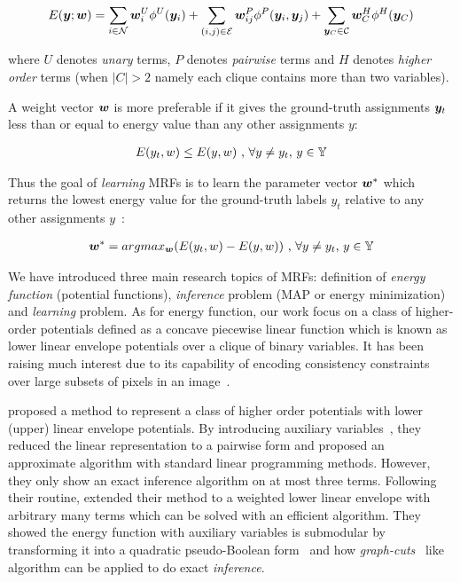 \begin{align}
  \label{eq:energyfunction_UPH}
  E({\bm{y}};{\bm{w}})=\sum_{i\in {\mathcal{N}}}{{\bm{w}}_i^U\phi^U({\bm{y}}_i)}+
  \sum_{(i,j)\in {\mathcal{E}}}{{\bm{w}}_{ij}^P\phi^P({\bm{y}}_i,{\bm{y}}_j)}+
  \sum_{{\bm{y}}_C\in {\mathcal{C}}}{{\bm{w}}_C^H\phi^H({\bm{y}}_C)}
\end{align}

\noindent where $U$ denotes \emph{unary} terms, $P$ denotes
\emph{pairwise} terms and $H$ denotes \emph{higher order} terms
(when $|C|>2$ namely each clique contains more than two
variables).

A weight vector ${\bm{w}}$ is more preferable if it gives the
ground-truth assignments ${\bm{y}}_t$ less than or equal to energy
value than any other assignments $y$:

\begin{align}
E(y_t,w)\leq E(y,w)~ \text{,~}\forall y \neq y_t
\text{,~} y\in {\mathbb{Y}}
\end{align}


Thus the goal of \emph{learning} MRFs is to learn the parameter
vector ${\bm{w}}^*$ which returns the lowest energy value for the
ground-truth labels $y_t$ relative to any other assignments
$y$~\cite{Szummer:ECCV08}:

\begin{align}
{\bm{w}}^* = argmax_{{\bm{w}}}(E(y_t,w)-E(y,w))~ \text{,~}\forall y \neq y_t
\text{,~} y\in {\mathbb{Y}}
\end{align}

We have introduced three main research topics of MRFs:
definition of \emph{energy function} (potential functions),
\emph{inference} problem (MAP or energy minimization) and
\emph{learning} problem. As for energy function, our work focus
on a class of higher-order potentials defined as a concave
piecewise linear function which is known as lower linear envelope
potentials over a clique of binary variables. It has been raising
much interest due to its capability of encoding consistency
constraints over large subsets of pixels in an
image~\cite{Kohli:CVPR07,Nowozin:2011}.

 proposed a method to represent a class
of higher order potentials with lower (upper) linear envelope
potentials. By introducing auxiliary
variables~\cite{Kohli:CVPR10}, they reduced the linear
representation to a pairwise form and proposed an approximate
algorithm with standard linear programming methods. However, they
only show an exact inference algorithm on at most three terms.
Following their routine,  extended their
method to a weighted lower linear envelope with arbitrary many
terms which can be solved with an efficient algorithm. They
showed the energy function with auxiliary variables is submodular
by transforming it into a quadratic pseudo-Boolean
form~\cite{Boros:MATH02} and how
\emph{graph-cuts}~\cite{Hammer:1965, Boykov:ICCV01, Freedman:CVPR05} like
algorithm can be applied to do exact \emph{inference}.

